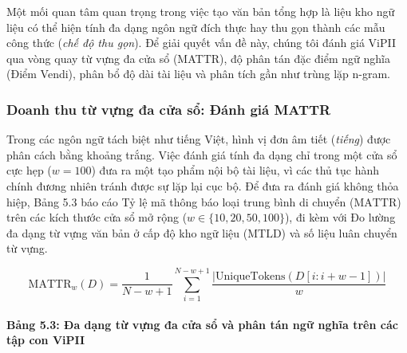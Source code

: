 \documentclass[
  11pt,
  a4paper,
]{article}
\begin{document}
Một mối quan tâm quan trọng trong việc tạo văn bản tổng hợp là liệu kho
ngữ liệu có thể hiện tính đa dạng ngôn ngữ đích thực hay thu gọn thành
các mẫu công thức (\emph{chế độ thu gọn}). Để giải quyết vấn đề này,
chúng tôi đánh giá ViPII qua vòng quay từ vựng đa cửa sổ (MATTR), độ
phân tán đặc điểm ngữ nghĩa (Điểm Vendi), phân bổ độ dài tài liệu và
phân tích gần như trùng lặp n-gram.

\subsubsection{Doanh thu từ vựng đa cửa sổ: Đánh giá
MATTR}\label{doanh-thu-tux1eeb-vux1ef1ng-ux111a-cux1eeda-sux1ed5-ux111uxe1nh-giuxe1-mattr}

Trong các ngôn ngữ tách biệt như tiếng Việt, hình vị đơn âm tiết
(\emph{tiếng}) được phân cách bằng khoảng trắng. Việc đánh giá tính đa
dạng chỉ trong một cửa sổ cực hẹp (\(w=100\)) đưa ra một tạo phẩm nội bộ
tài liệu, vì các thủ tục hành chính đương nhiên tránh được sự lặp lại
cục bộ. Để đưa ra đánh giá không thỏa hiệp, Bảng 5.3 báo cáo Tỷ lệ mã
thông báo loại trung bình di chuyển (\(\text{MATTR}\)) trên các kích
thước cửa sổ mở rộng (\(w \in \{10, 20, 50, 100\}\)), đi kèm với Đo
lường đa dạng từ vựng văn bản ở cấp độ kho ngữ liệu (\(\text{MTLD}\)) và
số liệu luân chuyển từ vựng.

\[\text{MATTR}_w(D) = \frac{1}{N - w + 1} \sum_{i=1}^{N - w + 1} \frac{|\text{UniqueTokens}(D[i : i+w-1])|}{w}\]

\paragraph{Bảng 5.3: Đa dạng từ vựng đa cửa sổ và phân tán ngữ nghĩa
trên các tập con
ViPII}\label{bux1ea3ng-5.3-ux111a-dux1ea1ng-tux1eeb-vux1ef1ng-ux111a-cux1eeda-sux1ed5-vuxe0-phuxe2n-tuxe1n-ngux1eef-nghux129a-truxean-cuxe1c-tux1eadp-con-vipii}
\end{document}
